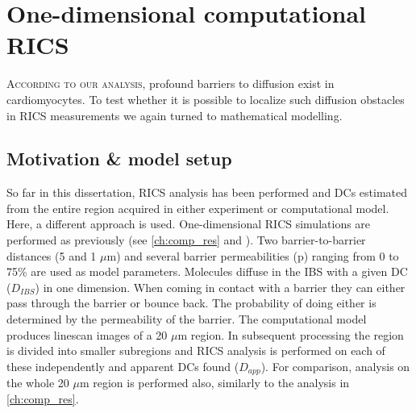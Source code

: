 \chapter{One-dimensional computational RICS}
\lettrine[lines=2, lhang=0.33, loversize=0.25]{A}{ccording to our
analysis,} profound barriers to diffusion exist in
cardiomyocytes. To test whether it is possible to localize such
diffusion obstacles in \ac{RICS} measurements we again turned to mathematical
modelling. 

\label{ch:1d_comp_res}
\section{Motivation \& model setup}
So far in this dissertation, \ac{RICS} analysis has been performed and
\acp{DC} estimated from the entire region acquired in either experiment
or computational model. Here, a different approach is used.
One-dimensional \ac{RICS} simulations are performed as previously (see
\ref{ch:comp_res} and \PaperIII). Two barrier-to-barrier
distances (5 and 1 $\mu$m) and several barrier permeabilities (p) ranging from 0 to
75\% are used as model parameters. Molecules diffuse in the \acl{IBS}
with a given \ac{DC} ($D_{IBS}$) in one dimension. When
coming in contact with a barrier they can either pass through the
barrier or bounce back. The probability of doing either is determined by
the permeability of the barrier. The computational model produces linescan images of a
20 $\mu$m region. In subsequent processing the region is divided into
smaller subregions and \ac{RICS} analysis is performed on each of these
independently and apparent \acp{DC} found ($D_{app}$). For comparison, analysis on the whole 20 $\mu$m region is
performed also, similarly to the analysis in \ref{ch:comp_res}.

